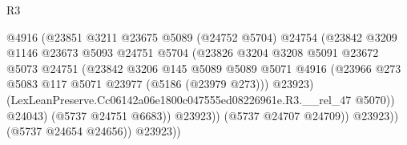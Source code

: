 \begin{lexlean}{R3}
\begin{coremodule}
                                            @4916
                                            (@23851
                                              @3211
                                              @23675
                                              @5089
                                              (@24752 @5704)
                                              @24754
                                              (@23842
                                                @3209
                                                @1146
                                                @23673
                                                @5093
                                                @24751
                                                @5704
                                                (@23826
                                                  @3204
                                                  @3208
                                                  @5091
                                                  @23672
                                                  @5073
                                                  @24751
                                                  (@23842
                                                    @3206
                                                    @145
                                                    @5089
                                                    @5089
                                                    @5071
                                                    @4916
                                                    (@23966
                                                      @273
                                                      @5083
                                                      @117
                                                      @5071
                                                      @23977
                                                      (@5186 (@23979 @273)))
                                                    @23923)
                                                  (LexLeanPreserve.Cc06142a06e1800c047555ed08226961e.R3.__rel_47
                                                    @5070))
                                                @24043)
                                              (@5737 @24751 @6683))
                                            @23923))
                                        (@5737 @24707 @24709))
                                      @23923))
                                  (@5737 @24654 @24656))
                                @23923))

\end{coremodule}
\end{lexlean}
